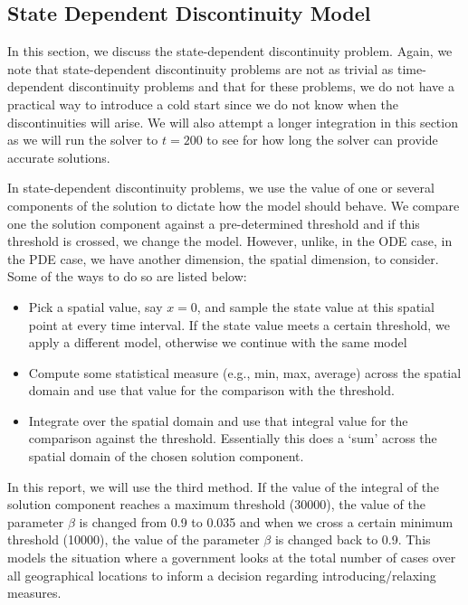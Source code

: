 \documentclass{article}
\begin{document}
\subsection{State Dependent Discontinuity Model}
\label{subsection:pde_state_intro}
In this section, we discuss the state-dependent discontinuity problem. Again, we note that state-dependent discontinuity problems are not as trivial as time-dependent discontinuity problems and that for these problems, we do not have a practical way to introduce a cold start since we do not know when the discontinuities will arise. We will also attempt a longer integration in this section as we will run the solver to $t=200$ to see for how long the solver can provide accurate solutions.

In state-dependent discontinuity problems, we use the value of one or several components of the solution to dictate how the model should behave. We compare one the solution component against a pre-determined threshold and if this threshold is crossed, we change the model. However, unlike, in the ODE case, in the PDE case, we have another dimension, the spatial dimension, to consider. Some of the ways to do so are listed below:
\begin{itemize}
\item Pick a spatial value, say $x=0$, and sample the state value at this spatial point at every time interval. If the state value meets a certain threshold, we apply a different model, otherwise we continue with the same model

\item Compute some statistical measure (e.g., min, max, average) across the spatial domain and use that value for the comparison with the threshold.

\item Integrate over the spatial domain and use that integral value for the comparison against the threshold. Essentially this does a `sum' across the spatial domain of the chosen solution component.
\end{itemize}

In this report, we will use the third method. If the value of the integral of the solution component reaches a maximum threshold (30000), the value of the parameter $\beta$ is changed from 0.9 to 0.035 and when we cross a certain minimum threshold (10000), the value of the parameter $\beta$ is changed back to 0.9. This models the situation where a government looks at the total number of cases over all geographical locations to inform a decision regarding introducing/relaxing measures.
\end{document}
